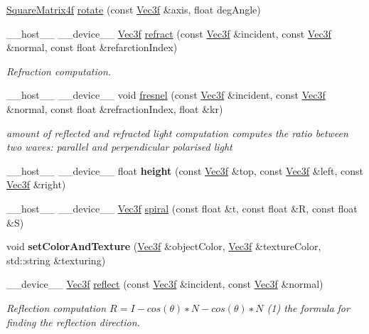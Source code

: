 \begin{DoxyCompactItemize}
\item 
\hyperlink{class_square_matrix4}{Square\+Matrix4f} \hyperlink{group__linear__algebra_gac7b995c759cd539cf455cae62c4184e6}{rotate} (const \hyperlink{class_vec3}{Vec3f} \&axis, float deg\+Angle)
\item 
\+\_\+\+\_\+host\+\_\+\+\_\+ \+\_\+\+\_\+device\+\_\+\+\_\+ \hyperlink{class_vec3}{Vec3f} \hyperlink{group__linear__algebra_gaabecdc3e2c4f70f7330aaa6eae1300ac}{refract} (const \hyperlink{class_vec3}{Vec3f} \&incident, const \hyperlink{class_vec3}{Vec3f} \&normal, const float \&refarction\+Index)
\begin{DoxyCompactList}\small\item\em Refraction computation. \end{DoxyCompactList}\item 
\+\_\+\+\_\+host\+\_\+\+\_\+ \+\_\+\+\_\+device\+\_\+\+\_\+ void \hyperlink{group__linear__algebra_ga02c442d21d81c8d0cf889f830eddc236}{fresnel} (const \hyperlink{class_vec3}{Vec3f} \&incident, const \hyperlink{class_vec3}{Vec3f} \&normal, const float \&refraction\+Index, float \&kr)\hypertarget{group__linear__algebra_ga02c442d21d81c8d0cf889f830eddc236}{}\label{group__linear__algebra_ga02c442d21d81c8d0cf889f830eddc236}

\begin{DoxyCompactList}\small\item\em amount of reflected and refracted light computation  computes the ratio between two waves\+: parallel and perpendicular polarised light \end{DoxyCompactList}\item 
\+\_\+\+\_\+host\+\_\+\+\_\+ \+\_\+\+\_\+device\+\_\+\+\_\+ float {\bfseries height} (const \hyperlink{class_vec3}{Vec3f} \&top, const \hyperlink{class_vec3}{Vec3f} \&left, const \hyperlink{class_vec3}{Vec3f} \&right)\hypertarget{group__linear__algebra_gad27b722eda4f769baea62a2fae211b20}{}\label{group__linear__algebra_gad27b722eda4f769baea62a2fae211b20}

\item 
\+\_\+\+\_\+host\+\_\+\+\_\+ \+\_\+\+\_\+device\+\_\+\+\_\+ \hyperlink{class_vec3}{Vec3f} \hyperlink{group__linear__algebra_gac9237c364274b9a0fbb9184fae573357}{spiral} (const float \&t, const float \&R, const float \&S)
\item 
void {\bfseries set\+Color\+And\+Texture} (\hyperlink{class_vec3}{Vec3f} \&object\+Color, \hyperlink{class_vec3}{Vec3f} \&texture\+Color, std\+::string \&texturing)\hypertarget{group__linear__algebra_gad9214d8b1430de7ca564900714f22194}{}\label{group__linear__algebra_gad9214d8b1430de7ca564900714f22194}

\item 
\+\_\+\+\_\+device\+\_\+\+\_\+ \hyperlink{class_vec3}{Vec3f} \hyperlink{group__linear__algebra_ga3f0e69590f012ccde6215b3e5ccd1615}{reflect} (const \hyperlink{class_vec3}{Vec3f} \&incident, const \hyperlink{class_vec3}{Vec3f} \&normal)
\begin{DoxyCompactList}\small\item\em Reflection computation $ R = I − cos(θ)∗N − cos(θ)∗N $ (1) the formula for finding the reflection direction. \end{DoxyCompactList}\end{DoxyCompactItemize}
